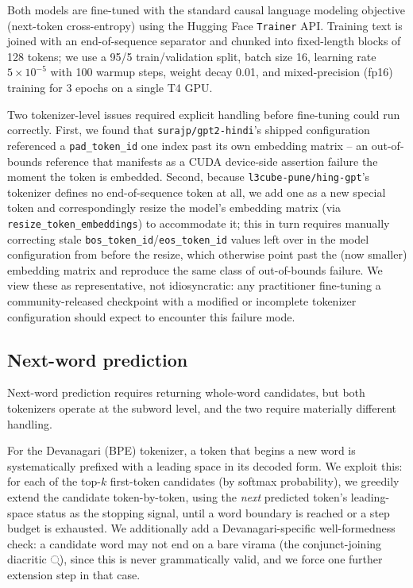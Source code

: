 \documentclass[11pt]{article}
\begin{document}
Both models are fine-tuned with the standard causal language modeling objective (next-token cross-entropy) using the Hugging Face \texttt{Trainer} API. Training text is joined with an end-of-sequence separator and chunked into fixed-length blocks of 128 tokens; we use a 95/5 train/validation split, batch size 16, learning rate $5\times10^{-5}$ with 100 warmup steps, weight decay 0.01, and mixed-precision (fp16) training for 3 epochs on a single T4 GPU.

Two tokenizer-level issues required explicit handling before fine-tuning could run correctly. First, we found that \texttt{surajp/gpt2-hindi}'s shipped configuration referenced a \texttt{pad\_token\_id} one index past its own embedding matrix -- an out-of-bounds reference that manifests as a CUDA device-side assertion failure the moment the token is embedded. Second, because \texttt{l3cube-pune/hing-gpt}'s tokenizer defines no end-of-sequence token at all, we add one as a new special token and correspondingly resize the model's embedding matrix (via \texttt{resize\_token\_embeddings}) to accommodate it; this in turn requires manually correcting stale \texttt{bos\_token\_id}/\texttt{eos\_token\_id} values left over in the model configuration from before the resize, which otherwise point past the (now smaller) embedding matrix and reproduce the same class of out-of-bounds failure. We view these as representative, not idiosyncratic: any practitioner fine-tuning a community-released checkpoint with a modified or incomplete tokenizer configuration should expect to encounter this failure mode.

\subsection{Next-word prediction}

Next-word prediction requires returning whole-word candidates, but both tokenizers operate at the subword level, and the two require materially different handling.

For the Devanagari (BPE) tokenizer, a token that begins a new word is systematically prefixed with a leading space in its decoded form. We exploit this: for each of the top-$k$ first-token candidates (by softmax probability), we greedily extend the candidate token-by-token, using the \emph{next} predicted token's leading-space status as the stopping signal, until a word boundary is reached or a step budget is exhausted. We additionally add a Devanagari-specific well-formedness check: a candidate word may not end on a bare virama (the conjunct-joining diacritic \texthindi{्}), since this is never grammatically valid, and we force one further extension step in that case.
\end{document}
